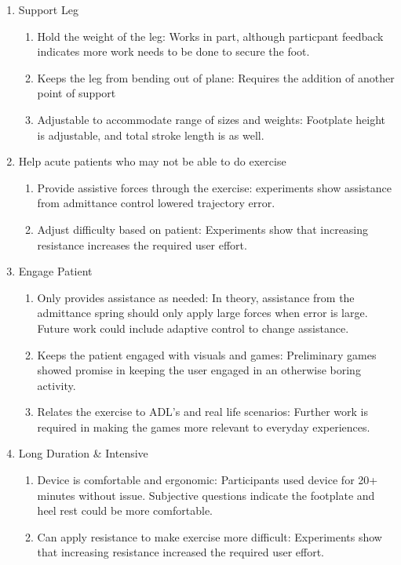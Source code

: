 \documentclass[12pt]{report}
\begin{document}
\begin{enumerate}[label*=\arabic*.]
	\item Support Leg
	\begin{enumerate}[label*=\arabic*.]
		\item Hold the weight of the leg: Works in part, although particpant feedback indicates more work needs to be done to secure the foot. 
		\item Keeps the leg from bending out of plane: Requires the addition of another point of support
		\item Adjustable to accommodate range of sizes and weights: Footplate height is adjustable, and total stroke length is as well. 
	\end{enumerate}
	\item Help acute patients who may not be able to do exercise
	\begin{enumerate}[label*=\arabic*.]
		\item Provide assistive forces through the exercise: experiments show assistance from admittance control lowered trajectory error.
		\item Adjust difficulty based on patient: Experiments show that increasing resistance increases the required user effort. 
	\end{enumerate}
	\item Engage Patient
	\begin{enumerate}[label*=\arabic*.]
		\item Only provides assistance as needed: In theory, assistance from the admittance spring should only apply large forces when error is large. Future work could include adaptive control to change assistance. 
		\item Keeps the patient engaged with visuals and games: Preliminary games showed promise in keeping the user engaged in an otherwise boring activity. 
		\item Relates the exercise to ADL's and real life scenarios: Further work is required in making the games more relevant to everyday experiences. 
	\end{enumerate}
	\item Long Duration \& Intensive
	\begin{enumerate}[label*=\arabic*.]
		\item Device is comfortable and ergonomic: Participants used device for 20+ minutes without issue. Subjective questions indicate the footplate and heel rest could be more comfortable. 
		\item Can apply resistance to make exercise more difficult: Experiments show that increasing resistance increased the required user effort. 

\end{enumerate}
\end{enumerate}
\end{document}
